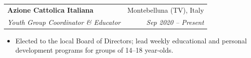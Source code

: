 \documentclass[10pt,a4paper]{article}
\makeatletter
\newcommand{\resumeItem}[1]{%
  \item\small{{#1}\vspace{-1.5pt}}%
}
\newcommand{\resumeSubheading}[4]{%
  \vspace{1pt}
  \noindent\begin{tabular*}{\textwidth}[t]{@{}l@{\extracolsep{\fill}}r@{}}
    \textbf{#1} & \textcolor{secondary}{\small #2} \\
    \textit{\small #3} & \textcolor{secondary}{\textit{\small #4}} \\
  \end{tabular*}\vspace{-3pt}
}
\newcommand{\resumeItemListStart}{\begin{itemize}[leftmargin=1.15em, itemsep=1.3pt, topsep=1pt, parsep=0pt]}
\newcommand{\resumeItemListEnd}{\end{itemize}\vspace{1.5pt}}
\makeatother
\begin{document}
\resumeSubheading
  {Azione Cattolica Italiana}{Montebelluna (TV), Italy}
  {Youth Group Coordinator \& Educator}{Sep 2020 -- Present}
  \resumeItemListStart
    \resumeItem{Elected to the local Board of Directors; lead weekly educational and personal development programs for groups of 14--18 year-olds.}
  \resumeItemListEnd
\end{document}
